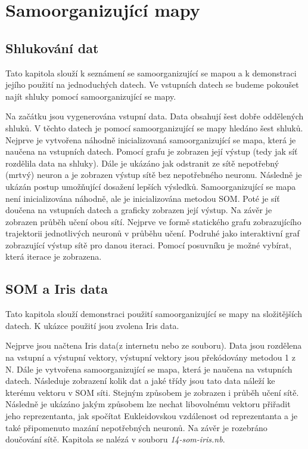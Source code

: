\documentclass[11pt,twoside,a4paper]{book}
\begin{document}
\section{Samoorganizující mapy}
\subsection{Shlukování dat}
Tato kapitola slouží k seznámení se samoorganizující se mapou a k demonstraci jejího použití na jednoduchých datech. Ve vstupních datech se budeme pokoušet najít shluky pomocí samoorganizující se mapy.

Na začátku jsou vygenerována vstupní data. Data obsahují šest dobře oddělených shluků. V těchto datech je pomocí samoorganizující se mapy hledáno šest shluků. Nejprve je vytvořena náhodně inicializovaná samoorganizující se mapa, která je naučena na vstupních datech. Pomocí grafu je zobrazen její výstup (tedy jak síť rozdělila data na shluky). Dále je ukázáno jak odstranit ze sítě nepotřebný (mrtvý) neuron a je zobrazen výstup sítě bez nepotřebného neuronu. Následně je ukázán postup umožňující dosažení lepších výsledků. Samoorganizující se mapa není inicializována náhodně, ale je inicializována metodou SOM. Poté je síť doučena na vstupních datech a graficky zobrazen její výstup. Na závěr je zobrazen průběh učení obou sítí. Nejprve ve formě statického grafu zobrazujícího trajektorii jednotlivých neuronů v průběhu učení. Podruhé jako interaktivní graf zobrazující výstup sítě pro danou iteraci. Pomocí posuvníku je možné vybírat, která iterace je zobrazena.
\subsection{SOM a Iris data}
Tato kapitola slouží demonstraci použití samoorganizující se mapy na složitějších datech. K ukázce použití jsou zvolena Iris data.

Nejprve jsou načtena Iris data(z internetu nebo ze souboru). Data jsou rozdělena na vstupní a výstupní vektory, výstupní vektory jsou překódovány metodou 1 z N. Dále je vytvořena samoorganizující se mapa, která je naučena na vstupních datech. Následuje zobrazení kolik dat a jaké třídy jsou tato data náleží ke kterému vektoru v SOM síti. Stejným způsobem je zobrazen i průběh učení sítě. Následně je ukázáno jakým způsobem lze nechat libovolnému vektoru přiřadit jeho reprezentanta, jak spočítat Eukleidovskou vzdálenost od reprezentanta a je také připomenuto mazání nepotřebných neuronů. Na závěr je rozebráno doučování sítě. Kapitola se nalézá v souboru \textit{14-som-iris.nb}.
\end{document}
